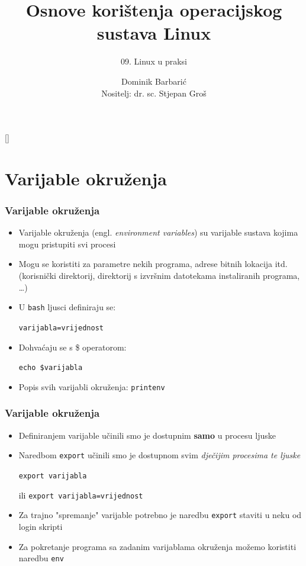 \documentclass[table,usenames,dvipsnames]{beamer}
\title{Osnove korištenja operacijskog sustava Linux}
\subtitle{09. Linux u praksi}
\author[Dominik Barbarić]{Dominik Barbarić\\ \small{Nositelj: dr. sc. Stjepan Groš}}
\institute[FER]{Sveučilište u Zagrebu \\
	Fakultet elektrotehnike i računarstva}
\date{\todayiso}
\newcommand{\shell}[1]{\texttt{#1}}
\begin{document}
{
	
	\begin{frame}
		\maketitle
	\end{frame}
}

\section{Varijable okruženja}
\begin{frame}[t]
	\frametitle{Varijable okruženja}
	\begin{itemize}
		\item Varijable okruženja (engl. \emph{environment variables}) su varijable sustava kojima mogu pristupiti svi procesi
		\item Mogu se koristiti za parametre nekih programa, adrese bitnih lokacija itd. (korisnički direktorij, direktorij s izvršnim datotekama instaliranih programa, \ldots)
		\item[]
		\item U \shell{bash} ljusci definiraju se:
		\item[] \shell{varijabla=vrijednost}
		\item Dohvaćaju se s \$ operatorom:
		\item[] \shell{echo \$varijabla}
		\item Popis svih varijabli okruženja: \shell{printenv}
	\end{itemize}
\end{frame}

\begin{frame}[t]
	\frametitle{Varijable okruženja}
	\begin{itemize}
		\item Definiranjem varijable učinili smo je dostupnim \textbf{samo} u procesu ljuske
		\item Naredbom \shell{export} učinili smo je dostupnom svim \emph{dječijim procesima te ljuske}
		\item[] \shell{export varijabla}
		\item[\textcolor{black}{ili}] \shell{export varijabla=vrijednost}
		\item[]
		\item Za trajno "spremanje" varijable potrebno je naredbu \shell{export} staviti u neku od login skripti
		\item[]
		\item Za pokretanje programa sa zadanim varijablama okruženja možemo koristiti naredbu \shell{env}
	\end{itemize}
\end{frame}
\end{document}

